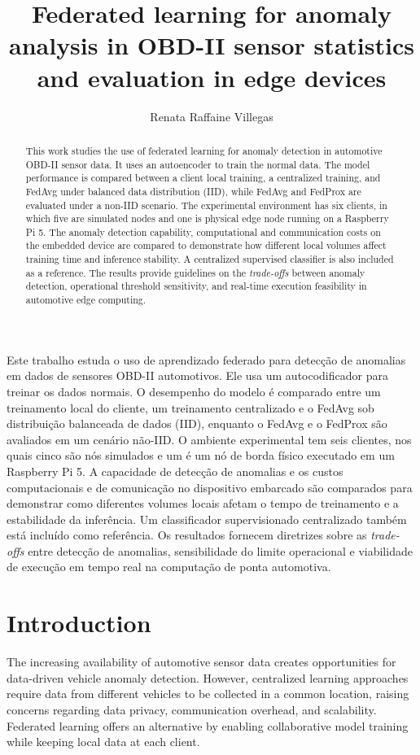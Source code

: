 \documentclass[12pt]{article}
\title{Federated learning for anomaly analysis in OBD-II sensor statistics and evaluation in edge devices}
\author{Renata Raffaine Villegas\inst{1}}
\begin{document}
 

\maketitle

\begin{resumo}
Este trabalho estuda o uso de aprendizado federado para detecção de anomalias em dados de sensores OBD-II automotivos. Ele usa um autocodificador para treinar os dados normais. O desempenho do modelo é comparado entre um treinamento local do cliente, um treinamento centralizado e o FedAvg sob distribuição balanceada de dados (IID), enquanto o FedAvg e o FedProx são avaliados em um cenário não-IID. O ambiente experimental tem seis clientes, nos quais cinco são nós simulados e um é um nó de borda físico executado em um Raspberry Pi 5. A capacidade de detecção de anomalias e os custos computacionais e de comunicação no dispositivo embarcado são comparados para demonstrar como diferentes volumes locais afetam o tempo de treinamento e a estabilidade da inferência. Um classificador supervisionado centralizado também está incluído como referência. Os resultados fornecem diretrizes sobre as \textit{trade-offs} entre detecção de anomalias, sensibilidade do limite operacional e viabilidade de execução em tempo real na computação de ponta automotiva.
\end{resumo}

\begin{abstract}
This work studies the use of federated learning for anomaly detection in automotive OBD-II sensor data. It uses an autoencoder to train the normal data. The model performance is compared between a client local training, a centralized training, and FedAvg under balanced data distribution (IID), while FedAvg and FedProx are evaluated under a non-IID scenario. The experimental environment has six clients, in which five are simulated nodes and one is physical edge node running on a Raspberry Pi 5. The anomaly detection capability, computational and communication costs on the embedded device are compared to demonstrate how different local volumes affect training time and inference stability. A centralized supervised classifier is also included as a reference. The results provide guidelines on the \textit{trade-offs} between anomaly detection, operational threshold sensitivity, and real-time execution feasibility in automotive edge computing.
\end{abstract}
     

\section{Introduction}
\label{sec:introduction}
The increasing availability of automotive sensor data creates opportunities for data-driven vehicle anomaly detection. However, centralized learning approaches require data from different vehicles to be collected in a common location, raising concerns regarding data privacy, communication overhead,
and scalability. Federated learning offers an alternative by enabling collaborative model training while keeping local data at each client.
\end{document}
